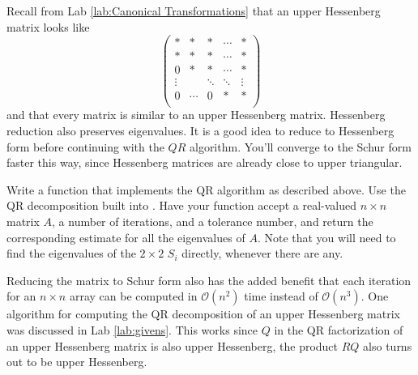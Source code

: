 Recall from Lab \ref{lab:Canonical Transformations} that an upper Hessenberg matrix looks like
\[
\begin{pmatrix}
* & * & * & \cdots & * \\
* & * & * & \cdots & * \\
0 & * & * & \cdots&* \\
\vdots & & \ddots & \ddots & \vdots \\
0 & \cdots & 0 & * & *\\
\end{pmatrix}
\]
and that every matrix is similar to an upper Hessenberg matrix.
Hessenberg reduction also preserves eigenvalues.
It is a good idea to reduce to Hessenberg form before continuing with the $QR$ algorithm.
You'll converge to the Schur form faster this way, since Hessenberg matrices are already close to upper triangular.

\begin{problem}
Write a function  that implements the QR algorithm as described above. Use the QR decomposition built into .
Have your function accept a real-valued $n \times n$ matrix $A$, a number of iterations, and a tolerance number,
and return the corresponding estimate for all the eigenvalues of $A$.
Note that you will need to find the eigenvalues of the $2 \times 2$ $S_i$ directly, whenever there are any.
\end{problem}

Reducing the matrix to Schur form also has the added benefit that each iteration for an $n \times n$ array can be computed in $\mathcal{O} \left( n^2 \right)$ time instead of $\mathcal{O} \left( n^3 \right)$.
One algorithm for computing the QR decomposition of an upper Hessenberg matrix was discussed in Lab \ref{lab:givens}.
This works since $Q$ in the QR factorization of an upper Hessenberg matrix is also upper Hessenberg, the product $R Q$ also turns out to be upper Hessenberg.

